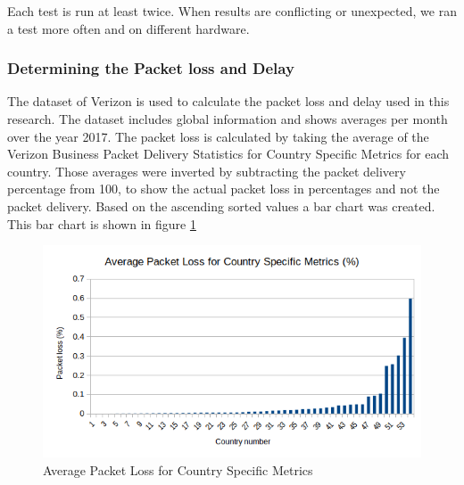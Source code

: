 \documentclass{article}
\begin{document}
Each test is run at least twice. When results are conflicting or unexpected, we
ran a test more often and on different hardware.



\subsubsection{Determining the Packet loss and Delay}

The dataset of Verizon \cite{verizon-latency} is used to calculate the packet loss and delay used in this research. The dataset includes global information and shows averages per month over the year 2017. The packet loss is calculated by taking the average of the Verizon Business Packet Delivery Statistics for Country Specific Metrics for each country. Those averages were inverted by subtracting the packet delivery percentage from 100, to show the actual packet loss in percentages and not the packet delivery. Based on the ascending sorted values a bar chart was created. This bar chart is shown in figure \ref{fig:packet-loss-chart}

\begin{figure}[H]
	\centering
		\includegraphics[scale=0.7]{figs/verizon-packetloss.png}
		\caption{Average Packet Loss for Country Specific Metrics}
	\label{fig:packet-loss-chart}
\end{figure}
\end{document}
